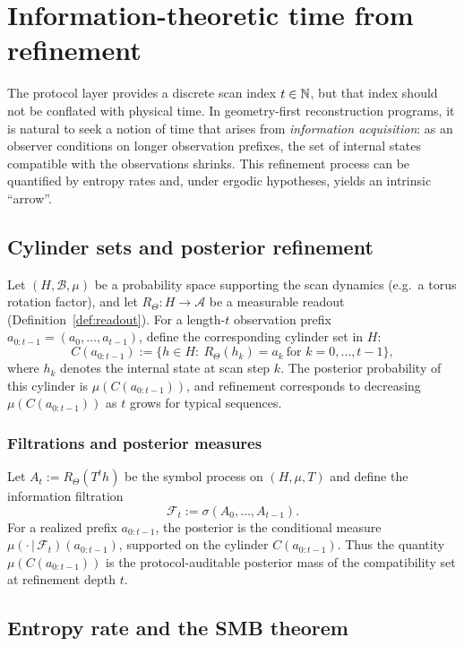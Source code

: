 \section{Information-theoretic time from refinement}\label{sec:info-time}

The protocol layer provides a discrete scan index $t\in\mathbb{N}$, but that index should not be conflated with physical time. In geometry-first reconstruction programs, it is natural to seek a notion of time that arises from \emph{information acquisition}: as an observer conditions on longer observation prefixes, the set of internal states compatible with the observations shrinks. This refinement process can be quantified by entropy rates and, under ergodic hypotheses, yields an intrinsic ``arrow''.

\subsection{Cylinder sets and posterior refinement}\label{sec:info-time:cylinders}

Let $(H,\mathcal{B},\mu)$ be a probability space supporting the scan dynamics (e.g.\ a torus rotation factor), and let $R_\Theta:H\to\mathcal{A}$ be a measurable readout (Definition~\ref{def:readout}). For a length-$t$ observation prefix $a_{0:t-1}=(a_0,\dots,a_{t-1})$, define the corresponding cylinder set in $H$:
\[
C(a_{0:t-1}) := \{h\in H:\ R_\Theta(h_k)=a_k\ \text{for }k=0,\dots,t-1\},
\]
where $h_k$ denotes the internal state at scan step $k$.
The posterior probability of this cylinder is $\mu(C(a_{0:t-1}))$, and refinement corresponds to decreasing $\mu(C(a_{0:t-1}))$ as $t$ grows for typical sequences.

\subsubsection{Filtrations and posterior measures}
Let $A_t:=R_\Theta(T^t h)$ be the symbol process on $(H,\mu,T)$ and define the information filtration
\[
\mathcal{F}_t:=\sigma(A_0,\dots,A_{t-1}).
\]
For a realized prefix $a_{0:t-1}$, the posterior is the conditional measure $\mu(\cdot\,|\,\mathcal{F}_t)(a_{0:t-1})$, supported on the cylinder $C(a_{0:t-1})$. Thus the quantity $\mu(C(a_{0:t-1}))$ is the protocol-auditable posterior mass of the compatibility set at refinement depth $t$.

\subsection{Entropy rate and the SMB theorem}\label{sec:info-time:smb}

